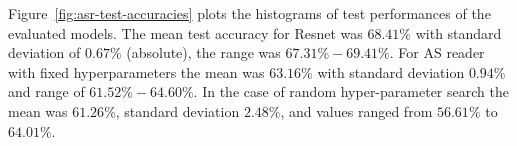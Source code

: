 \documentclass{article}
\newcommand{\cbtcn}{\gls{cbtcn}\xspace}
\newcommand{\ml}{\gls{ml}\xspace}
\begin{document}
\begin{appendices}

  


Figure~\ref{fig:asr-test-accuracies} plots the histograms of test performances of the evaluated models. The mean test accuracy for Resnet was $68.41\%$ with standard deviation of $0.67\%$ (absolute), the range was $67.31\% - 69.41\%$. For AS reader with fixed hyperparameters the mean was $63.16\%$ with standard deviation $0.94\%$ and range of $61.52\% - 64.60\%$.   In the case of random hyper-parameter search the mean was $61.26\%$, standard deviation $2.48\%$, and values ranged from $56.61\%$ to $64.01\%$.


\end{appendices}
\end{document}
